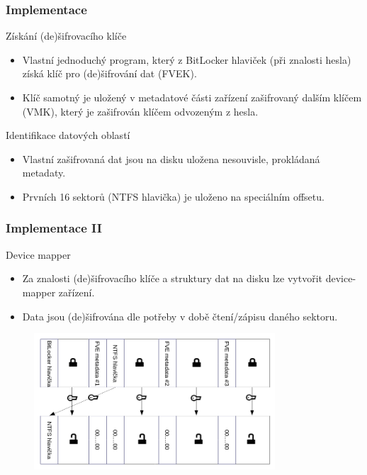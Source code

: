 \documentclass{beamer}
\begin{document}
\begin{frame}
	\frametitle{Implementace}
	\begin{block}{Získání (de)šifrovacího klíče}
		\begin{itemize}
			\item Vlastní jednoduchý program, který z BitLocker hlaviček (při znalosti hesla) získá klíč pro (de)šifrování dat (FVEK).
			\item Klíč samotný je uložený v metadatové části zařízení zašifrovaný dalším klíčem (VMK), který je zašifrován klíčem odvozeným z hesla.
		\end{itemize}
	\end{block}

	\begin{block}{Identifikace datových oblastí}
		\begin{itemize}
			\item Vlastní zašifrovaná dat jsou na disku uložena nesouvisle, prokládaná metadaty.
			\item Prvních 16 sektorů (NTFS hlavička) je uloženo na speciálním offsetu.
		\end{itemize}
	\end{block}
\end{frame}

\begin{frame}
	\frametitle{Implementace II}

	\begin{block}{Device mapper}
		\begin{itemize}
			\item Za znalosti (de)šifrovacího klíče a struktury dat na disku lze vytvořit device-mapper zařízení.
			\item Data jsou (de)šifrována dle potřeby v době čtení/zápisu daného sektoru.
		\end{itemize}
	\end{block}

\begin{figure}[ht!]
	\begin{center}
  	  \includegraphics[width=9cm]{img/bitlocker-decrypt-schema.png}
	\end{center}
	\end{figure}


\end{frame}
\end{document}
